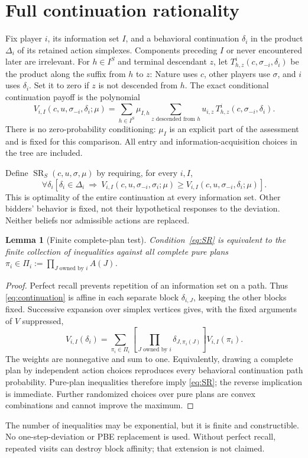 \documentclass[11pt,a4paper]{article}
\numberwithin{equation}{section}
\newtheorem{lemma}[theorem]{Lemma}
\theoremstyle{definition}
\DeclareMathOperator{\SR}{SR}
\begin{document}
\section{Full continuation rationality}\label{sec:SR}
Fix player \(i\), its information set \(I\), and a behavioral continuation
\(\delta_i\) in the product \(\Delta_i\) of its retained action simplexes.
Components preceding \(I\) or never encountered later are irrelevant.
For \(h\in I^S\) and terminal descendant \(z\), let
\(T^i_{h,z}(c,\sigma_{-i},\delta_i)\) be the product along the suffix
from \(h\) to \(z\): Nature uses \(c\), other players use \(\sigma\),
and \(i\) uses \(\delta_i\).
Set it to zero if \(z\) is not descended from \(h\).
The exact conditional continuation payoff is the polynomial
\begin{equation}\label{eq:continuation}
 V_{i,I}(c,u,\sigma_{-i},\delta_i;\mu)
 =\sum_{h\in I^S}\mu_{I,h}
      \sum_{z\text{ descended from }h}
           u_{i,z}\,T^i_{h,z}(c,\sigma_{-i},\delta_i).
\end{equation}
There is no zero-probability conditioning: \(\mu_I\) is an explicit
part of the assessment and is fixed for this comparison.
All entry and information-acquisition choices in the tree are included.

Define \(\SR_S(c,u,\sigma,\mu)\) by requiring, for every \(i,I\),
\begin{equation}\label{eq:SR}
 \forall\delta_i\left[
   \delta_i\in\Delta_i\ \Longrightarrow\
   V_{i,I}(c,u,\sigma_{-i},\sigma_i;\mu)
   \ge V_{i,I}(c,u,\sigma_{-i},\delta_i;\mu)\right].
\end{equation}
This is optimality of the entire continuation at every information
set. Other bidders' behavior is fixed, not their hypothetical responses
to the deviation. Neither beliefs nor admissible actions are
replaced.

\begin{lemma}[Finite complete-plan test]\label{lem:pure}
Condition~\eqref{eq:SR} is equivalent to the finite collection of
inequalities against all complete pure plans
\(\pi_i\in\Pi_i:=\prod_{J\text{ owned by }i}A(J)\).
\end{lemma}
\begin{proof}
Perfect recall prevents repetition of an information set on a path.
Thus \eqref{eq:continuation} is affine in each separate block
\(\delta_{i,J}\), keeping the other blocks fixed.
Successive expansion over simplex vertices gives, with the fixed
arguments of \(V\) suppressed,
\[
 V_{i,I}(\delta_i)
 =\sum_{\pi_i\in\Pi_i}
   \left[\prod_{J\text{ owned by }i}\delta_{J,\pi_i(J)}\right]
       V_{i,I}(\pi_i).
\]
The weights are nonnegative and sum to one.
Equivalently, drawing a complete plan by independent action choices
reproduces every behavioral continuation path probability.
Pure-plan inequalities therefore imply \eqref{eq:SR}; the reverse
implication is immediate. Further randomized choices over pure plans
are convex combinations and cannot improve the maximum.
\end{proof}
The number of inequalities may be exponential, but it is finite and
constructible. No one-step-deviation or PBE replacement is used.
Without perfect recall, repeated visits can destroy block affinity;
that extension is not claimed.
\end{document}
